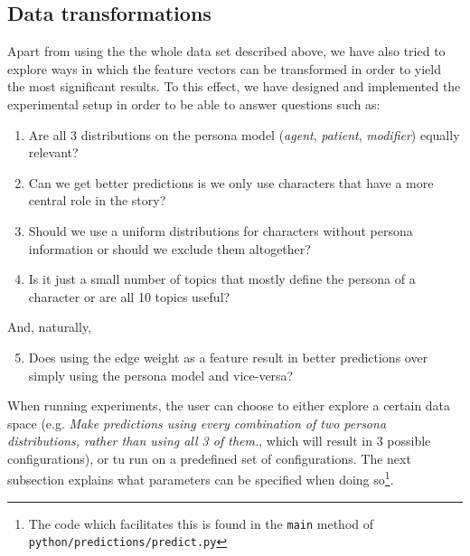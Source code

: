 \documentclass[bsc,frontabs,singlespacing,parskip]{infthesis} %
\begin{document}
\subsection{Data transformations}
Apart from using the the whole data set described above, we have also tried to explore ways in which the feature vectors can be transformed in order to yield the most significant results. To this effect, we have designed and implemented the experimental setup in order to be able to answer questions such as:
\begin{enumerate}
	\item Are all 3 distributions on the persona model (\textit{agent}, \textit{patient}, \textit{modifier}) equally relevant?
	\item Can we get better predictions is we only use characters that have a more central role in the story?
	\item Should we use a uniform distributions for characters without persona information or should we exclude them altogether?
	\item Is it just a small number of topics that mostly define the persona of a character or are all 10 topics useful?
\end{enumerate}
And, naturally,
\begin{enumerate}
	\setcounter{enumi}{4}
	\item Does using the edge weight as a feature result in better predictions over simply using the persona model and vice-versa?
\end{enumerate}

When running experiments, the user can choose to either explore a certain data space (e.g. \textit{Make predictions using every combination of two persona distributions, rather than using all 3 of them.}, which will result in 3 possible configurations), or tu run on a predefined set of configurations. The next subsection explains what parameters can be specified when doing so\footnote{The code which facilitates this is found in the \texttt{main} method of \texttt{python/predictions/predict.py}}. 
\end{document}
